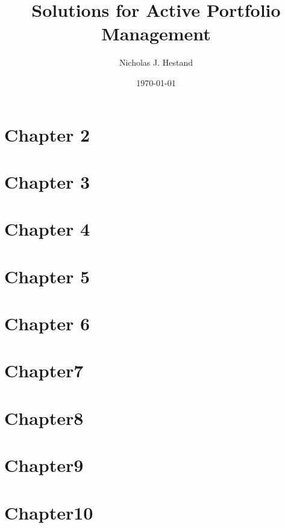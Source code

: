 \documentclass[10pt]{article}
\begin{document}
  \title{Solutions for Active Portfolio Management}
  \author{Nicholas J. Hestand}
  \date{\today}
  
  \maketitle
  
  \section*{Chapter 2}
  
  
  \newpage
  \section*{Chapter 3}
  
  
  \newpage
  \section*{Chapter 4}
  
  
  \newpage
  \section*{Chapter 5}
  
  
  \newpage
  \section*{Chapter 6}
  
  
  \newpage
  \section*{Chapter7}
  
  
  \newpage
  \section*{Chapter8}
  
  
  \newpage
  \section*{Chapter9}
  
  
  \newpage
  \section*{Chapter10}
  
\end{document}
